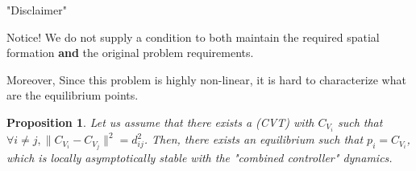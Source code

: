 \documentclass[t]{beamer}
\newcommand{\norm}[1]{\lVert #1 \rVert}
\newtheorem*{Proposition}{Proposition}
\begin{document}
\begin{frame}[label=lloydsandformation3]{"Disclaimer"}
\begin{alertblock}{Notice!}
We do not supply a condition to both maintain the required spatial formation \textbf{and} the original problem requirements.
\end{alertblock}

Moreover, Since this problem is highly non-linear, it is hard to characterize what are the equilibrium points.
\pause
\begin{Proposition}
Let us assume that there exists a (CVT) with $C_{V_{i}}$ such that $\forall i \neq j, \norm{C_{V_{i}} - C_{V_{j}}}^{2} = d_{ij}^{2}$. Then, there exists an equilibrium such that $p_{i} = C_{V_{i}}$, which is locally asymptotically stable with the "combined controller" dynamics.
\end{Proposition}
\end{frame}
\subsection[Simulations]{}
\end{document}
